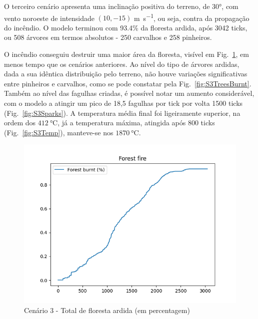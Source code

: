 O terceiro cenário apresenta uma inclinação positiva do terreno, de \ang{30}, com vento noroeste de intensidade $(10, -15)$ \si{\meter\per\second}, ou seja, contra da propagação do incêndio.
O modelo terminou com 93.4\% da floresta ardida, após 3042 ticks, ou 508 árvores em termos absolutos - 250 carvalhos e 258 pinheiros.

O incêndio conseguiu destruir uma maior área da floresta, visível em Fig.~\ref{fig:S3ForestBurnt}, em menos tempo que os cenários anteriores.
Ao nível do tipo de árvores ardidas, dada a sua idêntica distribuição pelo terreno, não houve variações significativas entre pinheiros e carvalhos, como se pode constatar pela Fig.~\ref{fig:S3TreesBurnt}.
Também ao nível das fagulhas criadas, é possível notar um aumento considerável, com o modelo a atingir um pico de 18,5 fagulhas por tick por volta
1500 ticks (Fig.~\ref{fig:S3Sparks}). A temperatura média final foi ligeiramente superior, na ordem dos $\SI{412}{\degreeCelsius}$, já a temperatura máxima, atingida após 800 ticks (Fig.~\ref{fig:S3Temp}), manteve-se nos $\SI{1870}{\degreeCelsius}$.

\begin{figure}[H]
    \centering
    \includegraphics[width=\textwidth]{../src/runs/scenario3/forest_fire}
    \caption{Cenário 3 - Total de floresta ardida (em percentagem)}
    \label{fig:S3ForestBurnt}
\end{figure}

